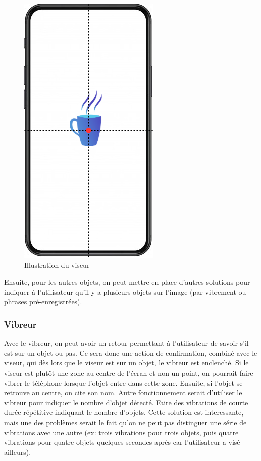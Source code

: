 \documentclass[UTF8]{EPURapport}
\begin{document}
\begin{figure}[h!]
\centering
  \includegraphics[width=.4\textwidth]{images/viseur.png}
  \caption{Illustration du viseur}
  \label{fig:viseur}
\end{figure}

Ensuite, pour les autres objets, on peut mettre en place d'autres solutions pour indiquer à l'utilisateur qu'il y a plusieurs objets sur l'image (par vibrement ou phrases pré-enregistrées).

\subsubsection{Vibreur}
Avec le vibreur, on peut avoir un retour permettant à l'utilisateur de savoir s'il est sur un objet ou pas. Ce sera donc une action de confirmation, combiné avec le viseur, qui dès lors que le viseur est sur un objet, le vibreur est enclenché. Si le viseur est plutôt une zone au centre de l'écran et non un point, on pourrait faire vibrer le téléphone lorsque l'objet entre dans cette zone. Ensuite, si l'objet se retrouve au centre, on cite son nom.
Autre fonctionnement serait d'utiliser le vibreur pour indiquer le nombre d'objet détecté. Faire des vibrations de courte durée répétitive indiquant le nombre d'objets. Cette solution est interessante, mais une des problèmes serait le fait qu'on ne peut pas distinguer une série de vibrations avec une autre (ex: trois vibrations pour trois objets, puis quatre vibrations pour quatre objets quelques secondes après car l'utilisateur a visé ailleurs).
\end{document}
